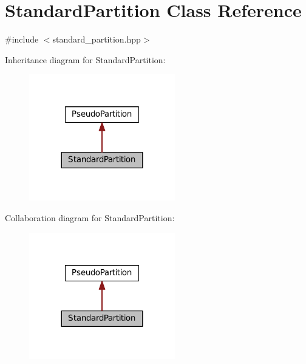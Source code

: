 \hypertarget{classStandardPartition}{}\section{Standard\+Partition Class Reference}
\label{classStandardPartition}


{\ttfamily \#include $<$standard\+\_\+partition.\+hpp$>$}



Inheritance diagram for Standard\+Partition\+:
\nopagebreak
\begin{figure}[H]
\begin{center}
\leavevmode
\includegraphics[width=180pt]{classStandardPartition__inherit__graph}
\end{center}
\end{figure}


Collaboration diagram for Standard\+Partition\+:
\nopagebreak
\begin{figure}[H]
\begin{center}
\leavevmode
\includegraphics[width=180pt]{classStandardPartition__coll__graph}
\end{center}
\end{figure}
